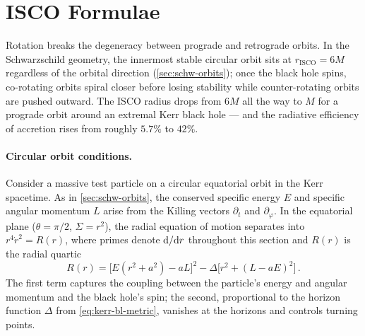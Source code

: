 \section{ISCO Formulae}
\label{sec:kerr-isco}

Rotation breaks the degeneracy between prograde and retrograde
orbits.  In the Schwarzschild geometry, the innermost stable circular
orbit sits at $r_{\text{ISCO}} = 6M$ regardless of the orbital
direction (\cref{sec:schw-orbits}); once the black hole spins,
co-rotating orbits spiral closer before losing stability while
counter-rotating orbits are pushed outward.  The ISCO radius drops
from $6M$ all the way to $M$ for a prograde orbit around an extremal
Kerr black hole --- and the radiative efficiency of accretion rises
from roughly $5.7\%$ to $42\%$.

\paragraph{Circular orbit conditions.}

Consider a massive test particle on a circular equatorial orbit in
the Kerr spacetime.  As in \cref{sec:schw-orbits}, the conserved
specific energy $E$ and specific angular momentum $L$ arise from
the Killing vectors $\partial_t$ and $\partial_\varphi$.  In the
equatorial plane ($\theta = \pi/2$, $\Sigma = r^2$), the radial
equation of motion separates into $r^4\dot{r}^2 = R(r)$, where
primes denote $\mathrm{d}/\mathrm{d} r$ throughout this section and $R(r)$ is the
radial quartic \cite{Bardeen1972}
%
\begin{equation}
  R(r) = \bigl[E(r^2 + a^2) - aL\bigr]^2
    - \Delta\bigl[r^2 + (L - aE)^2\bigr] \,.
  \label{eq:kerr-radial-R}
\end{equation}
%
The first term captures the coupling between the particle's energy
and angular momentum and the black hole's spin; the second,
proportional to the horizon function $\Delta$ from
\cref{eq:kerr-bl-metric}, vanishes at the horizons and controls
turning points.

